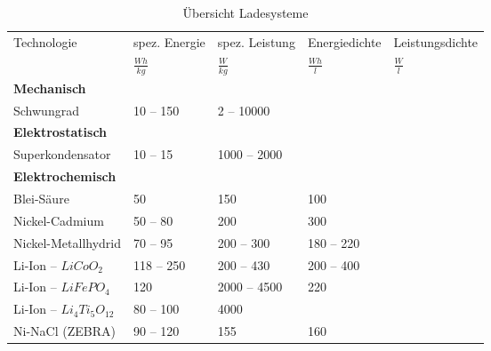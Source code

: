 \begin{table}\centering
	\begin{tabularx}{\linewidth}{lXXXX}
		\toprule
		\multirow{2}{*}{Technologie} & spez. Energie   & spez. Leistung & Energiedichte  & Leistungsdichte \\
		                             & $\frac{Wh}{kg}$ & $\frac{W}{kg}$ & $\frac{Wh}{l}$ & $\frac{W}{l}$   \\ \midrule
		\textbf{Mechanisch}          &                 &                &                &  \\
		Schwungrad                   & 10 -- 150       & 2 -- 10000     &                &  \\
		\textbf{Elektrostatisch}     &                 &                &                &  \\
		Superkondensator             & 10 -- 15        & 1000 -- 2000   &                &  \\
		\textbf{Elektrochemisch}     &                 &                &                &  \\
		Blei-Säure                   & 50              & 150            & 100            &  \\
		Nickel-Cadmium               & 50 -- 80        & 200            & 300            &  \\
		Nickel-Metallhydrid          & 70 -- 95        & 200 -- 300     & 180 -- 220     &  \\
		Li-Ion -- $LiCoO_2$          & 118 -- 250      & 200 -- 430     & 200 -- 400     &  \\
		Li-Ion -- $LiFePO_4$         & 120             & 2000 -- 4500   & 220            &  \\
		Li-Ion -- $Li_4Ti_5O_{12}$   & 80 -- 100       & 4000           &                &  \\
		Ni-NaCl (ZEBRA)              & 90 -- 120       & 155            & 160            &  \\ \bottomrule
	\end{tabularx}
	\caption{Übersicht Ladesysteme}
\end{table}